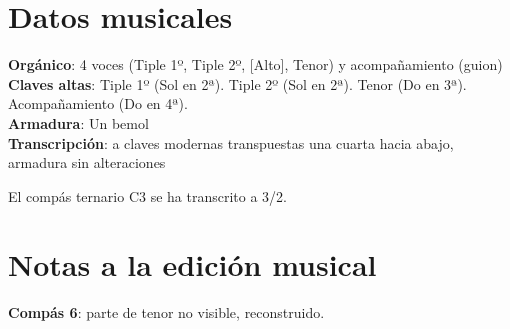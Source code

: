 
\section*{\centering\Large{Datos musicales}}
\noindent \textbf{Orgánico}: 4 voces (Tiple 1º, Tiple 2º, [Alto], Tenor) y acompañamiento (guion)\\
\textbf{Claves altas}: Tiple 1º (Sol en 2ª). Tiple 2º (Sol en 2ª). Tenor (Do en 3ª). Acompañamiento (Do en 4ª).\\
\textbf{Armadura}: Un bemol\\
\textbf{Transcripción}: a claves modernas transpuestas una cuarta hacia abajo, armadura sin alteraciones


\noindent El compás ternario C3 se ha transcrito a 3/2.

\section*{\centering\Large{Notas a la edición musical}}
\noindent \textbf{Compás 6}: parte de tenor no visible, reconstruido.

